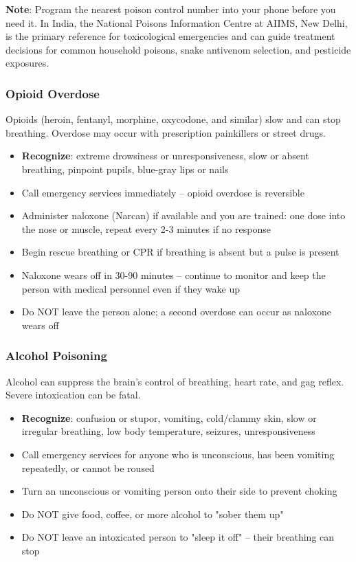 \textbf{Note}: Program the nearest poison control number into your phone before you need it. In India, the National Poisons Information Centre at AIIMS, New Delhi, is the primary reference for toxicological emergencies and can guide treatment decisions for common household poisons, snake antivenom selection, and pesticide exposures.

\subsubsection{Opioid Overdose}

Opioids (heroin, fentanyl, morphine, oxycodone, and similar) slow and can stop breathing. Overdose may occur with prescription painkillers or street drugs.

\begin{itemize}[leftmargin=*]
  \item \textbf{Recognize}: extreme drowsiness or unresponsiveness, slow or absent breathing, pinpoint pupils, blue-gray lips or nails
  \item Call emergency services immediately -- opioid overdose is reversible \cite{ilcor_2025,aha_arc_2024}
  \item Administer naloxone (Narcan) if available and you are trained: one dose into the nose or muscle, repeat every 2-3 minutes if no response
  \item Begin rescue breathing or CPR if breathing is absent but a pulse is present
  \item Naloxone wears off in 30-90 minutes -- continue to monitor and keep the person with medical personnel even if they wake up
  \item Do NOT leave the person alone; a second overdose can occur as naloxone wears off
\end{itemize}

\subsubsection{Alcohol Poisoning}

Alcohol can suppress the brain's control of breathing, heart rate, and gag reflex. Severe intoxication can be fatal.

\begin{itemize}[leftmargin=*]
  \item \textbf{Recognize}: confusion or stupor, vomiting, cold/clammy skin, slow or irregular breathing, low body temperature, seizures, unresponsiveness
  \item Call emergency services for anyone who is unconscious, has been vomiting repeatedly, or cannot be roused
  \item Turn an unconscious or vomiting person onto their side to prevent choking
  \item Do NOT give food, coffee, or more alcohol to "sober them up"
  \item Do NOT leave an intoxicated person to "sleep it off" -- their breathing can stop
\end{itemize}

